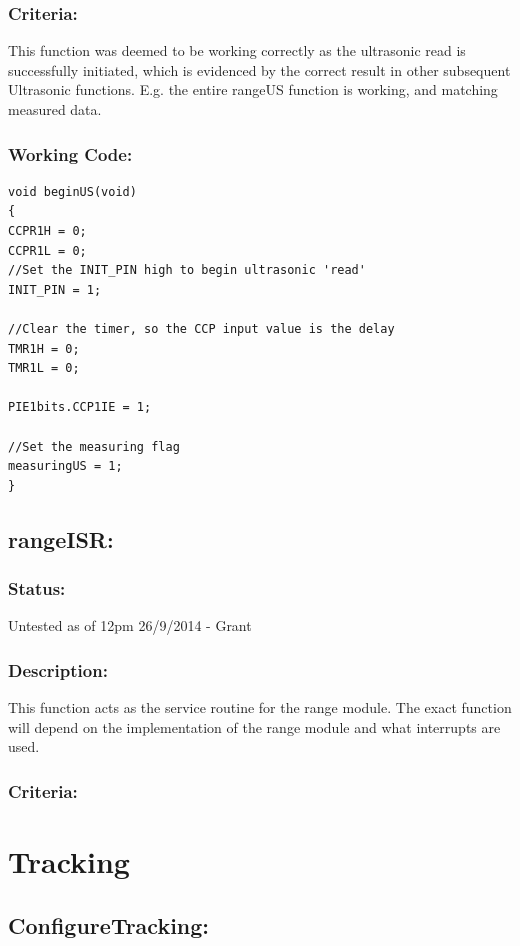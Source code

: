 \documentclass[]{report}
\begin{document}
\subsubsection{Criteria:}
This function was deemed to be working correctly as the ultrasonic read is successfully initiated, which is evidenced by the correct result in other subsequent Ultrasonic functions. E.g. the entire rangeUS function is working, and matching measured data.

\subsubsection{Working Code:}
\begin{lstlisting}
void beginUS(void)
{
CCPR1H = 0;
CCPR1L = 0;
//Set the INIT_PIN high to begin ultrasonic 'read'
INIT_PIN = 1;

//Clear the timer, so the CCP input value is the delay
TMR1H = 0;
TMR1L = 0;

PIE1bits.CCP1IE = 1;

//Set the measuring flag
measuringUS = 1;
}
\end{lstlisting}

\subsection{rangeISR:}
\subsubsection{Status:}
Untested as of 12pm 26/9/2014 - Grant

\subsubsection{Description:}
This function acts as the service routine for the range module. The exact function will depend on the implementation of the range module and what interrupts are used.

\subsubsection{Criteria:}

\newpage
\section{Tracking}

\subsection{ConfigureTracking:}
\end{document}
